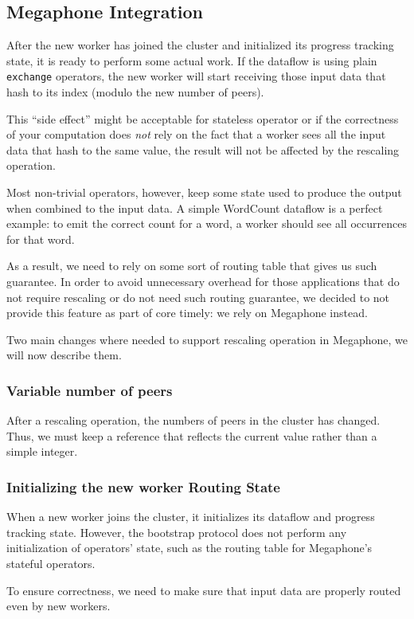 \documentclass[12pt]{extarticle}
\begin{document}
\subsection{Megaphone Integration}

After the new worker has joined the cluster and initialized its progress tracking state, it is ready to perform some actual
work. If the dataflow is using plain \verb|exchange| operators, the new worker will start receiving those input data
that hash to its index (modulo the new number of peers).

This ``side effect'' might be acceptable for stateless operator or if the correctness of your computation does \textit{not}
rely on the fact that a worker sees all the input data that hash to the same value, the result will not be affected by the
rescaling operation.

Most non-trivial operators, however, keep some state used to produce the output when combined to the input data.
A simple WordCount dataflow is a perfect example: to emit the correct count for a word,
a worker should see all occurrences for that word.

As a result, we need to rely on some sort of routing table that gives us such guarantee.
In order to avoid unnecessary overhead for those applications that do not require rescaling or do not need such routing
guarantee, we decided to not provide this feature as part of core timely: we rely on Megaphone instead.

Two main changes where needed to support rescaling operation in Megaphone, we will now describe them.

\subsubsection{Variable number of peers}
After a rescaling operation, the numbers of peers in the cluster has changed. Thus, we must keep a reference
that reflects the current value rather than a simple integer.

\subsubsection{Initializing the new worker Routing State}
When a new worker joins the cluster, it initializes its dataflow and progress tracking state.
However, the bootstrap protocol does not perform any initialization of operators' state, such as the
routing table for Megaphone's stateful operators.

To ensure correctness, we need to make sure that input data are properly routed even by new workers.
\end{document}
